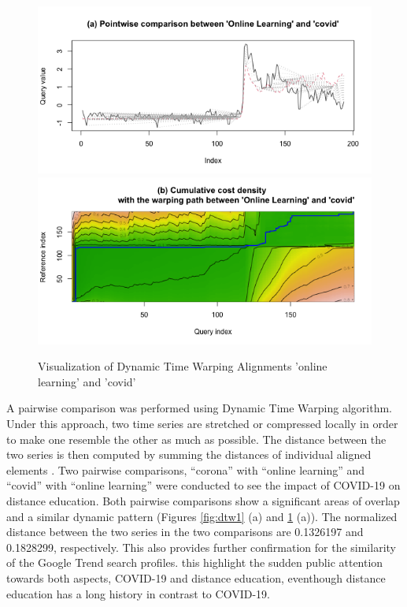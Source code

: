 \documentclass[11pt,a4paper,]{article}
\begin{document}
\begin{figure}[h]

{\centering \includegraphics[width=1\textwidth]{figure/dtw2-1} \includegraphics[width=1\textwidth]{figure/dtw2-2} 

}

\caption{Visualization of Dynamic Time Warping Alignments  'online learning' and 'covid'}\label{fig:dtw2}
\end{figure}

A pairwise comparison was performed using Dynamic Time Warping algorithm. Under this approach, two time series are stretched or compressed locally in order to make one resemble the other as much as possible. The distance between the two series is then computed by summing the distances of individual aligned elements \autocite{giorgino2009computing}. Two pairwise comparisons, ``corona'' with ``online learning'' and ``covid'' with ``online learning'' were conducted to see the impact of COVID-19 on distance education. Both pairwise comparisons show a significant areas of overlap and a similar dynamic pattern (Figures \ref{fig:dtw1} (a) and \ref{fig:dtw2} (a)). The normalized distance between the two series in the two comparisons are 0.1326197 and 0.1828299, respectively. This also provides further confirmation for the similarity of the Google Trend search profiles. this highlight the sudden public attention towards both aspects, COVID-19 and distance education, eventhough distance education has a long history in contrast to COVID-19.
\end{document}
